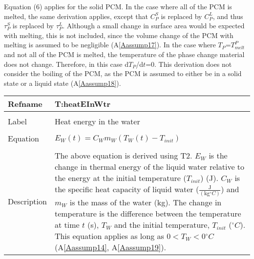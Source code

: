 \documentclass[12pt]{article}
\begin{document}
Equation (6) applies for the solid PCM. In the case where all of the PCM is melted, the same derivation applies, except that $C_{P}^{S}$ is replaced by $C_{P}^{L}$, and thus $\tau{}_{P}^{S}$ is replaced by $\tau{}_{P}^{L}$. Although a small change in surface area would be expected with melting, this is not included, since the volume change of the PCM with melting is assumed to be negligible (A\ref{Aassump17}).
In the case where $T_{P}$=$T_{melt}^{P}$ and not all of the PCM is melted, the temperature of the phase change material does not change. Therefore, in this case d$T_{P}$/d$t$=0.
This derivation does not consider the boiling of the PCM, as the PCM is assumed to either be in a solid state or a liquid state (A\ref{Aassump18}).
~\newline
\noindent \begin{minipage}{\textwidth}
\begin{tabular}{p{} p{}}
\toprule \textbf{Refname} & \textbf{T:heatEInWtr}
\label{T:heatEInWtr}
\\ \midrule \\
Label & Heat energy in the water
\\ \midrule \\
Equation & $E_{W}\left(t\right)=C_{W}m_{W}\left(T_{W}\left(t\right)-T_{init}\right)$
\\ \midrule \\
Description & The above equation is derived using T2. $E_{W}$ is the change in thermal energy of the liquid water relative to the energy at the initial temperature ($T_{init}$) (J). $C_{W}$ is the specific heat capacity of liquid water ($\frac{\text{J}}{(\text{kg}{}^{\circ}C)}$) and $m_{W}$ is the mass of the water (kg). The change in temperature is the difference between the temperature at time $t$ (s), $T_{W}$ and the initial temperature, $T_{init}$ (${}^{\circ}C$). This equation applies as long as $0<T_{W}<0$${}^{\circ}C$ (A\ref{Aassump14}, A\ref{Aassump19}).
\\ \bottomrule \end{tabular}
\end{minipage}\\
~\newline
\end{document}
